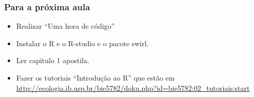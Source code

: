 \documentclass[handout]{beamer}
\begin{document}
\begin{frame}
  \frametitle{Para a próxima aula}
  \begin{itemize}
    \item Realizar ``Uma hora de código''
  \item Instalar o R e o R-studio e o pacote swirl.
  \item Ler capitulo 1 apostila.
  \item  Fazer os tutoriais ``Introdução ao R'' que estão em \url{http://ecologia.ib.usp.br/bie5782/doku.php?id=bie5782:02_tutoriais:start}
  \end{itemize}
  
\end{frame}
\end{document}
